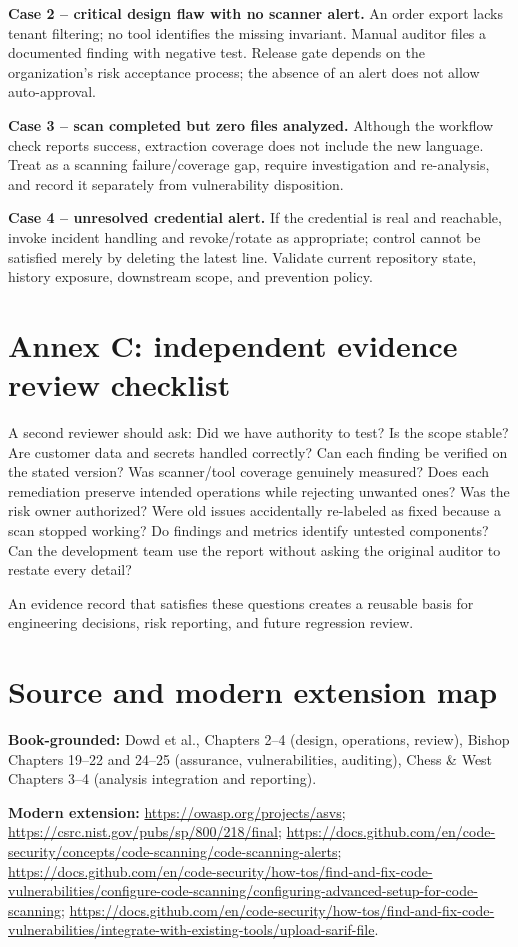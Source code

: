 \documentclass[
  letterpaper,
]{article}
\begin{document}
\textbf{Case 2 -- critical design flaw with no scanner alert.} An order
export lacks tenant filtering; no tool identifies the missing invariant.
Manual auditor files a documented finding with negative test. Release
gate depends on the organization's risk acceptance process; the absence
of an alert does not allow auto-approval.

\textbf{Case 3 -- scan completed but zero files analyzed.} Although the
workflow check reports success, extraction coverage does not include the
new language. Treat as a scanning failure/coverage gap, require
investigation and re-analysis, and record it separately from
vulnerability disposition.

\textbf{Case 4 -- unresolved credential alert.} If the credential is
real and reachable, invoke incident handling and revoke/rotate as
appropriate; control cannot be satisfied merely by deleting the latest
line. Validate current repository state, history exposure, downstream
scope, and prevention policy.

\section{Annex C: independent evidence review
checklist}\label{annex-c-independent-evidence-review-checklist}

A second reviewer should ask: Did we have authority to test? Is the
scope stable? Are customer data and secrets handled correctly? Can each
finding be verified on the stated version? Was scanner/tool coverage
genuinely measured? Does each remediation preserve intended operations
while rejecting unwanted ones? Was the risk owner authorized? Were old
issues accidentally re-labeled as fixed because a scan stopped working?
Do findings and metrics identify untested components? Can the
development team use the report without asking the original auditor to
restate every detail?

An evidence record that satisfies these questions creates a reusable
basis for engineering decisions, risk reporting, and future regression
review.

\section{Source and modern extension
map}\label{source-and-modern-extension-map}

\textbf{Book-grounded:} Dowd et al., Chapters 2--4 (design, operations,
review), Bishop Chapters 19--22 and 24--25 (assurance, vulnerabilities,
auditing), Chess \& West Chapters 3--4 (analysis integration and
reporting).

\textbf{Modern extension:} \url{https://owasp.org/projects/asvs};
\url{https://csrc.nist.gov/pubs/sp/800/218/final};
\url{https://docs.github.com/en/code-security/concepts/code-scanning/code-scanning-alerts};
\url{https://docs.github.com/en/code-security/how-tos/find-and-fix-code-vulnerabilities/configure-code-scanning/configuring-advanced-setup-for-code-scanning};
\url{https://docs.github.com/en/code-security/how-tos/find-and-fix-code-vulnerabilities/integrate-with-existing-tools/upload-sarif-file}.
\end{document}
